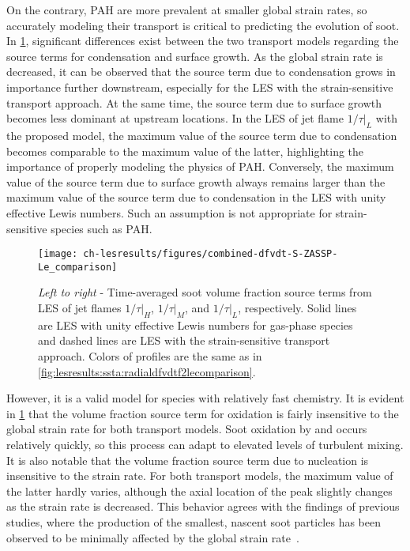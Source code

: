 On the contrary, PAH are more prevalent at smaller global strain rates, so accurately modeling their transport is critical to predicting the evolution of soot. In \cref{fig:lesresults:strain:allflamesdfvdt}, significant differences exist between the two transport models regarding the source terms for condensation and surface growth. As the global strain rate is decreased, it can be observed that the source term due to condensation grows in importance further downstream, especially for the LES with the strain-sensitive transport approach. At the same time, the source term due to surface growth becomes less dominant at upstream locations. In the LES of jet flame $1/\tau|_L$ with the proposed model, the maximum value of the source term due to condensation becomes comparable to the maximum value of the latter, highlighting the importance of properly modeling the physics of PAH. Conversely, the maximum value of the source term due to surface growth always remains larger than the maximum value of the source term due to condensation in the LES with unity effective Lewis numbers. Such an assumption is not appropriate for strain-sensitive species such as PAH.

\begin{figure}[htb]
  \centering
  \texttt{[image: ch-lesresults/figures/combined-dfvdt-S-ZASSP-Le\_comparison]}
  \caption[Centerline \texorpdfstring{$\langle df_V/dt \rangle$}{<dfV/dt>} from LES of Flames \texorpdfstring{$1/\tau|_H$}{1/t|H}, \texorpdfstring{$1/\tau|_M$}{1/t|M}, and \texorpdfstring{$1/\tau|_L$}{1/t|L} with Various Transport Approaches]{\textit{Left to right} - Time-averaged soot volume fraction source terms from LES of jet flames $1/\tau|_H$, $1/\tau|_M$, and $1/\tau|_L$, respectively. Solid lines are LES with unity effective Lewis numbers for gas-phase species and dashed lines are LES with the strain-sensitive transport approach. Colors of profiles are the same as in \cref{fig:lesresults:ssta:radialdfvdtf2lecomparison}.}
  \label{fig:lesresults:strain:allflamesdfvdt}
\end{figure}

However, it is a valid model for species with relatively fast chemistry. It is evident in \cref{fig:lesresults:strain:allflamesdfvdt} that the volume fraction source term for oxidation is fairly insensitive to the global strain rate for both transport models. Soot oxidation by  and  occurs relatively quickly, so this process can adapt to elevated levels of turbulent mixing. It is also notable that the volume fraction source term due to nucleation is insensitive to the strain rate. For both transport models, the maximum value of the latter hardly varies, although the axial location of the peak slightly changes as the strain rate is decreased. This behavior agrees with the findings of previous studies, where the production of the smallest, nascent soot particles has been observed to be minimally affected by the global strain rate~\cite{huijnen2010}.
